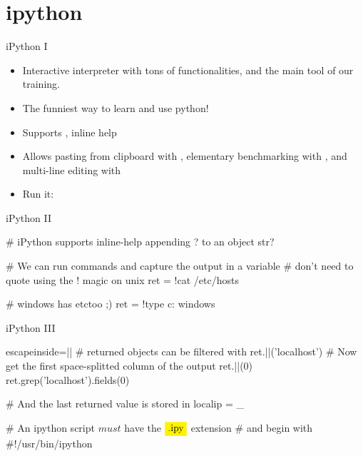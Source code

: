 \section{ipython}



\begin{pyframe}{iPython I}
\begin{itemize}
\item Interactive interpreter with tons of                                                                                                        functionalities, and the main tool of our training.                                                                                                      

\item   The funniest way to learn and use python!

\item   Supports , inline help 

\item   Allows pasting from clipboard with  , elementary
    benchmarking with , and multi-line editing with 

\item   Run it: \\
\end{itemize}

\end{pyframe}


\begin{pyframe}{iPython II}
\begin{pycode}
# iPython supports inline-help appending ? to an object
str?

# We can run commands and capture the output in a variable
# don't need to quote using the ! magic on unix
ret = !cat /etc/hosts

# windows has etc\hosts too ;)
ret = !type c: windows\drivers\etc\hosts
\end{pycode}
\end{pyframe}


\begin{pyframe}{iPython III}
\begin{pycode*}{escapeinside=||}
# returned objects can be filtered with  
ret.||('localhost')
# Now get the first space-splitted column of the output
ret.||(0)
ret.grep('localhost').fields(0)

# And the last returned value is stored in 
localip = _

# An ipython script $must$ have the $\pyver{.ipy}$ extension
#  and begin with #!/usr/bin/ipython 
\end{pycode*}
\end{pyframe}

